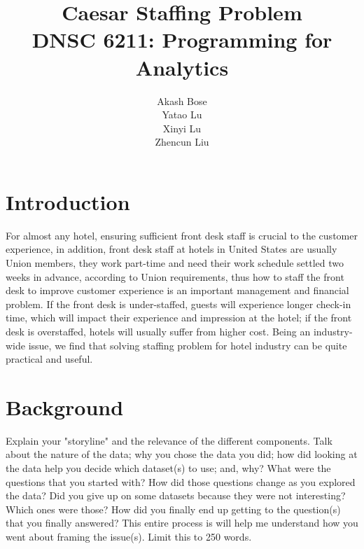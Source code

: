\documentclass{article}
\title{Caesar Staffing Problem  \\ \small{DNSC 6211: Programming for Analytics}}
\author{
    Akash Bose \\
	Yatao Lu \\
	Xinyi Lu \\
	Zhencun Liu \\
}
\date{}
\begin{document}
\maketitle


\pagebreak
\tableofcontents


\pagebreak

%
%
\section{Introduction}
\label{introduction}

For almost any hotel, ensuring sufficient front desk staff is crucial to the customer experience, in addition, front desk staff at hotels in United States are usually Union members, they work part-time and need their work schedule settled two weeks in advance, according to Union requirements, thus how to staff the front desk to improve customer experience is an important management and financial problem. If the front desk is under-staffed, guests will experience longer check-in time, which will impact their experience and impression at the hotel; if the front desk is overstaffed, hotels will usually suffer from higher cost. Being an industry-wide issue, we find that solving staffing problem for hotel industry can be quite practical and useful. 

\section{Background}

Explain your "storyline" and the relevance of the different components. Talk about the nature of the data; why you chose the data you did; how did looking at the data help you decide which dataset(s) to use; and, why? What were the questions that you started with? How did those questions change as you explored the data? Did you give up on some datasets because they were not interesting? Which ones were those? How did you finally end up getting to the question(s) that you finally answered? This entire process is will help me understand how you went about framing the issue(s). Limit this to 250 words.
\end{document}
